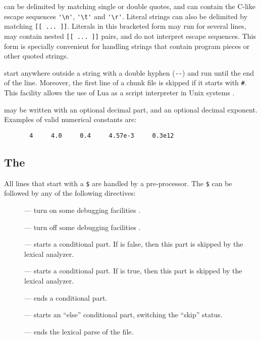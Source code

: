 can be delimited by matching single or double quotes,
and can contain the C-like escape sequences
\verb|'\n'|, \verb|'\t'| and \verb|'\r'|.
Literal strings can also be delimited by matching \verb|[[ ... ]]|.
Literals in this bracketed form may run for several lines,
may contain nested \verb|[[ ... ]]| pairs,
and do not interpret escape sequences.
This form is specially convenient for
handling strings that contain program pieces or
other quoted strings.

 start anywhere outside a string with a
double hyphen (\verb|--|) and run until the end of the line.
Moreover,
the first line of a chunk file is skipped if it starts with \verb|#|.
This facility allows the use of Lua as a script interpreter
in Unix systems .

 may be written with an optional decimal part,
and an optional decimal exponent.
Examples of valid numerical constants are:
\begin{verbatim}
       4     4.0     0.4     4.57e-3     0.3e12
\end{verbatim}

\subsection{The } \label{pre-processor}

All lines that start with a \verb|$| are handled by a pre-processor.
The \verb|$| can be followed by any of the following directives:
\begin{description}
\item[] --- turn on some debugging facilities .
\item[] --- turn off some debugging facilities .
\item[] --- starts a conditional part.
If  is false, then this part is skipped by the lexical analyzer.
\item[] --- starts a conditional part.
If  is true, then this part is skipped by the lexical analyzer.
\item[] --- ends a conditional part.
\item[] --- starts an ``else'' conditional part,
switching the ``skip'' status.
\item[] --- ends the lexical parse of the file.
\end{description}

